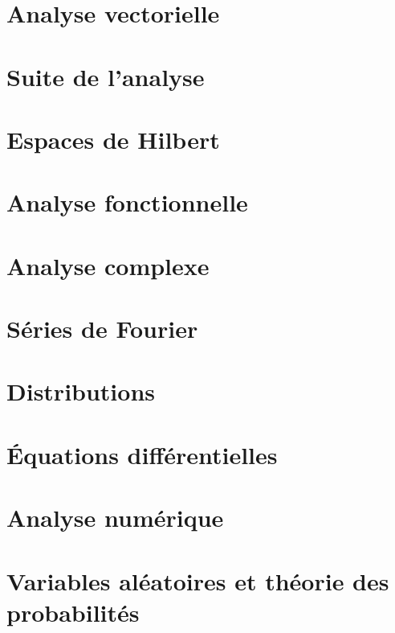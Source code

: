 \chapter{Analyse vectorielle}



\chapter{Suite de l'analyse}







\chapter{Espaces de Hilbert}


\chapter{Analyse fonctionnelle}



\chapter{Analyse complexe}          \label{ChapICHIooXbLccl}




\chapter{Séries de Fourier}



\chapter{Distributions}


\chapter{Équations différentielles}



\chapter{Analyse numérique}


\chapter{Variables aléatoires et théorie des probabilités}




